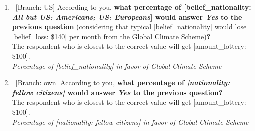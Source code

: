\begin{enumerate}[resume]
{Do you support the Global Climate Scheme?
} [\textit{Figures \ref{fig:ics}, \ref{fig:warm_glow_substitute}, \ref{fig:ncs_gcs_ics}}; 
\verb|gcs_support|]
  \\ \textit{Yes; No}\\\\
~[new page] [\textit{Two random branches: own; US}; \textit{Figure \ref{fig:ncs_gcs_ics}}; \verb|gcs_belief, variant_belief|] 
\item ~[Branch: US] \label{q:gcs_belief_us} According to you, \textbf{what percentage of [belief\_nationality: \textit{All but US: Americans; US: Europeans}] would answer \textit{Yes }to the previous question} (considering that typical [belief\_nationality] would lose [belief\_loss: \$140] per month from the Global Climate Scheme)\textbf{?}\\ The respondent who is closest to the correct value will get [amount\_lottery: \$100]. %
  \\ \textit{Percentage of [belief\_nationality] in favor of Global Climate Scheme}

\item ~[Branch: own] \label{q:gcs_belief_own} According to you, \textbf{what percentage of \textit{[nationality: fellow citizens]} would answer \textit{Yes }to the previous question?}\\ The respondent who is closest to the correct value will get [amount\_lottery: \$100]. %
  \\ \textit{Percentage of [nationality: fellow citizens] in favor of Global Climate Scheme}

\end{enumerate} 

